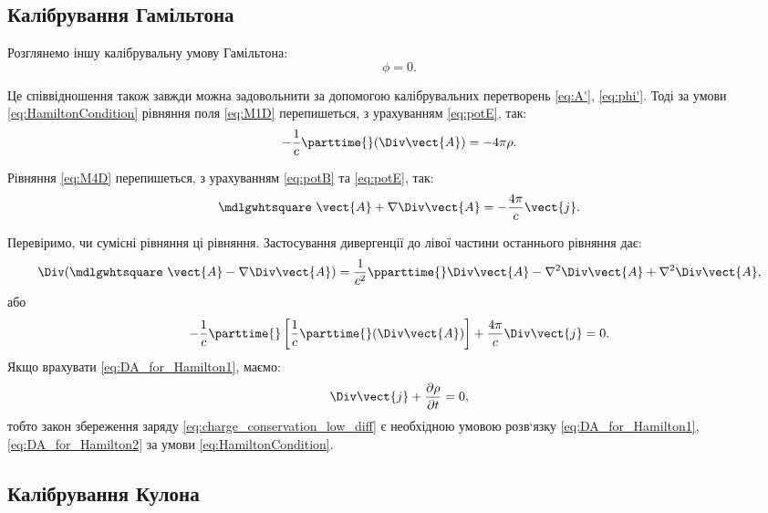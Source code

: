 \subsection*{Калібрування Гамільтона}

Розглянемо іншу калібрувальну умову Гамільтона:
\begin{equation}\label{eq:HamiltonCondition}
	\phi = 0.
\end{equation}

Це співвідношення також завжди можна задовольнити за допомогою
калібрувальних перетворень \eqref{eq:A'}, \eqref{eq:phi'}. Тоді за умови \eqref{eq:HamiltonCondition} рівняння
поля \eqref{eq:M1D} перепишеться, з урахуванням \eqref{eq:potE}, так:
\begin{equation}
	-\frac1c \parttime{} (\Div \vect{A}) = -4\pi \rho.
\end{equation}

Рівняння \eqref{eq:M4D} перепишеться, з урахуванням \eqref{eq:potB} та \eqref{eq:potE}, так:
\begin{equation}\label{eq:DA_for_Hamilton1}
	\mdlgwhtsquare\ \vect{A}  + \nabla \Div\vect{A} = -\frac{4\pi}{c} \vect{j}.
\end{equation}

Перевіримо, чи сумісні рівняння ці рівняння. Застосування
дивергенції до лівої частини останнього рівняння дає:
\begin{equation*}
	\Div(\mdlgwhtsquare\ \vect{A}  - \nabla \Div\vect{A}) = \frac1{c^2} \pparttime{} \Div\vect{A} - \nabla^2\Div\vect{A} + \nabla^2\Div\vect{A},
\end{equation*}
або
\begin{equation}\label{eq:DA_for_Hamilton2}
	-\frac1c \parttime{} \left[ \frac1c \parttime{} (\Div\vect{A})\right] + \frac{4\pi}c \Div\vect{j} = 0.
\end{equation}
Якщо врахувати \eqref{eq:DA_for_Hamilton1}, маємо:
\begin{equation*}
	\Div \vect{j} + \frac{\partial \rho}{\partial t} = 0,
\end{equation*}
тобто закон збереження заряду \eqref{eq:charge_conservation_low_diff} є необхідною умовою розв`язку
\eqref{eq:DA_for_Hamilton1}, \eqref{eq:DA_for_Hamilton2} за умови \eqref{eq:HamiltonCondition}.


\subsection*{Калібрування Кулона}


